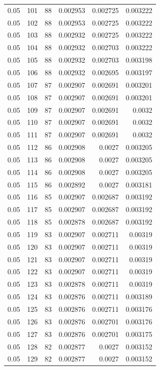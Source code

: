 \begin{tabular}{rrrrrr}
0.05 & 101 & 88 & 0.002953 & 0.002725 & 0.003222 \\
0.05 & 102 & 88 & 0.002953 & 0.002725 & 0.003222 \\
0.05 & 103 & 88 & 0.002932 & 0.002725 & 0.003222 \\
0.05 & 104 & 88 & 0.002932 & 0.002703 & 0.003222 \\
0.05 & 105 & 88 & 0.002932 & 0.002703 & 0.003198 \\
0.05 & 106 & 88 & 0.002932 & 0.002695 & 0.003197 \\
0.05 & 107 & 87 & 0.002907 & 0.002691 & 0.003201 \\
0.05 & 108 & 87 & 0.002907 & 0.002691 & 0.003201 \\
0.05 & 109 & 87 & 0.002907 & 0.002691 & 0.0032 \\
0.05 & 110 & 87 & 0.002907 & 0.002691 & 0.0032 \\
0.05 & 111 & 87 & 0.002907 & 0.002691 & 0.0032 \\
0.05 & 112 & 86 & 0.002908 & 0.0027 & 0.003205 \\
0.05 & 113 & 86 & 0.002908 & 0.0027 & 0.003205 \\
0.05 & 114 & 86 & 0.002908 & 0.0027 & 0.003205 \\
0.05 & 115 & 86 & 0.002892 & 0.0027 & 0.003181 \\
0.05 & 116 & 85 & 0.002907 & 0.002687 & 0.003192 \\
0.05 & 117 & 85 & 0.002907 & 0.002687 & 0.003192 \\
0.05 & 118 & 85 & 0.002878 & 0.002687 & 0.003192 \\
0.05 & 119 & 83 & 0.002907 & 0.002711 & 0.00319 \\
0.05 & 120 & 83 & 0.002907 & 0.002711 & 0.00319 \\
0.05 & 121 & 83 & 0.002907 & 0.002711 & 0.00319 \\
0.05 & 122 & 83 & 0.002907 & 0.002711 & 0.00319 \\
0.05 & 123 & 83 & 0.002878 & 0.002711 & 0.00319 \\
0.05 & 124 & 83 & 0.002876 & 0.002711 & 0.003189 \\
0.05 & 125 & 83 & 0.002876 & 0.002711 & 0.003176 \\
0.05 & 126 & 83 & 0.002876 & 0.002701 & 0.003176 \\
0.05 & 127 & 83 & 0.002876 & 0.002701 & 0.003175 \\
0.05 & 128 & 82 & 0.002877 & 0.0027 & 0.003152 \\
0.05 & 129 & 82 & 0.002877 & 0.0027 & 0.003152 \\

\end{tabular}
